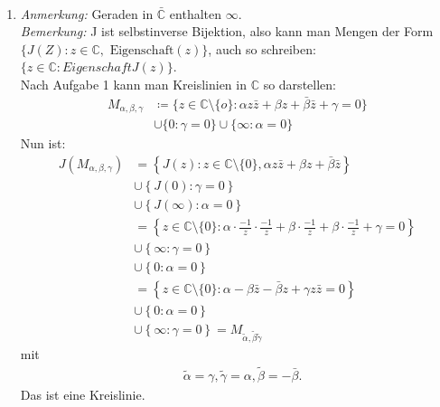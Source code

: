 \begin{solution}
  \
  \begin{enumerate}[label= (\alph*)] 
    \item \emph{Anmerkung:} Geraden in \( \bar{\mathbb{C}} \) enthalten \( \infty \). \\
    \emph{Bemerkung:} J ist selbstinverse Bijektion, also kann man Mengen der Form \( \{ J(Z): z \in \mathbb{C}, \text{ Eigenschaft} (z) \} \), auch so schreiben: \\
    \( \{ z \in \mathbb{C} : Eigenschaft J(z) \} \). \\
    Nach Aufgabe 1 kann man Kreislinien in \( \mathbb{C} \) so darstellen: \\
    \begin{align*}
      M_{\alpha, \beta, \gamma} &\coloneqq \{ z \in \mathbb{C} \setminus \{ o \} : \alpha z \bar{z} + \beta z + \bar{\beta} \bar{z} + \gamma = 0 \} \\
      &\cup \{ 0 : \gamma = 0 \} \cup \{ \infty : \alpha = 0 \}
    \end{align*}
    Nun ist:
    \begin{align*}
      J(M_{\alpha, \beta, \gamma}) &= \left \{ J(z): z \in \mathbb{C} \setminus \{ 0 \}, \alpha z \bar{z} + \beta z + \bar{\beta} \bar{z} \right \} \\
      &\cup \left \{ J(0): \gamma = 0 \right \} \\
      &\cup \left \{ J(\infty): \alpha = 0 \right \} \\
      &= \left \{ z \in \mathbb{C} \setminus \{ 0 \} : \alpha \cdot \frac{-1}{z} \cdot \frac{-1}{z} + \beta \cdot \frac{-1}{z} + \beta \cdot \frac{-1}{z} + \gamma = 0 \right \} \\
      &\cup \left \{ \infty : \gamma = 0 \right \} \\
      &\cup \left \{ 0 : \alpha = 0 \right \} \\
      &= \left \{ z \in \mathbb{C} \setminus \{ 0 \} : \alpha - \beta \bar{z} - \bar{\beta}z + \gamma z \bar{z} = 0 \right \} \\
      &\cup \left \{ 0 : \alpha = 0 \right \} \\
      &\cup \left \{ \infty : \gamma = 0 \right \} = M_{\tilde{\alpha}, \tilde{\beta} \tilde{\gamma}}
    \end{align*}
    mit
    \begin{align*}
      &\tilde{\alpha} = \gamma, \tilde{\gamma} = \alpha, \tilde{\beta} = - \bar{\beta}.
    \end{align*}
    Das ist eine Kreislinie.

\end{enumerate}
\end{solution}
